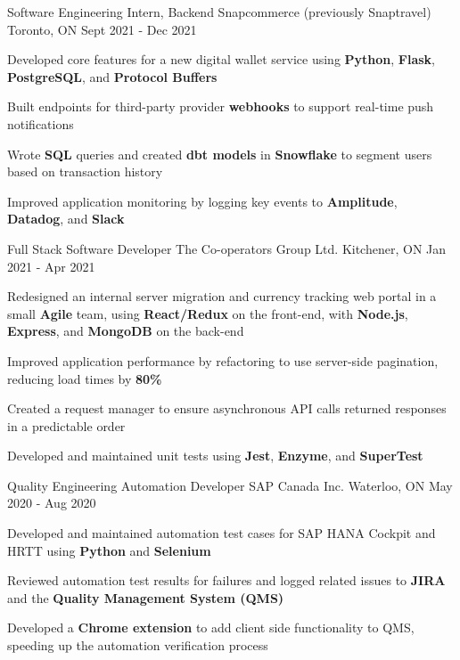 
\begin{cventries}
  \cventry
    {Software Engineering Intern, Backend} %
    {Snapcommerce (previously Snaptravel)} %
    {Toronto, ON} %
    {Sept 2021 - Dec 2021} %
    {
      \begin{cvitems} %
      \item {Developed core features for a new digital wallet service using \textbf{Python}, \textbf{Flask}, \textbf{PostgreSQL}, and \textbf{Protocol Buffers}}
      \item {Built endpoints for third-party provider \textbf{webhooks} to support real-time push notifications}
      \item {Wrote \textbf{SQL} queries and created \textbf{dbt models} in \textbf{Snowflake} to segment users based on transaction history}
      \item {Improved application monitoring by logging key events to \textbf{Amplitude}, \textbf{Datadog}, and \textbf{Slack}}
      \end{cvitems}
    }

  \cventry
    {Full Stack Software Developer} %
    {The Co-operators Group Ltd.} %
    {Kitchener, ON} %
    {Jan 2021 - Apr 2021} %
    {
      \begin{cvitems} %
      \item {Redesigned an internal server migration and currency tracking web portal in a small \textbf{Agile} team, using \textbf{React/Redux} on the front-end, with \textbf{Node.js}, \textbf{Express}, and \textbf{MongoDB} on the back-end}
      \item {Improved application performance by refactoring to use server-side pagination, reducing load times by \textbf{80\%}}
      \item {Created a request manager to ensure asynchronous API calls returned responses in a predictable order}
      \item {Developed and maintained unit tests using \textbf{Jest}, \textbf{Enzyme}, and \textbf{SuperTest}}
      \end{cvitems}
    }
    
  \cventry
    {Quality Engineering Automation Developer} %
    {SAP Canada Inc.} %
    {Waterloo, ON} %
    {May 2020 - Aug 2020} %
    {
      \begin{cvitems} %
      \item {Developed and maintained automation test cases for SAP HANA Cockpit and HRTT using \textbf{Python} and \textbf{Selenium}}
		  \item {Reviewed automation test results for failures and logged related issues to \textbf{JIRA} and the \textbf{Quality Management System (QMS)}}
		  \item {Developed a \textbf{Chrome extension} to add client side functionality to QMS, speeding up the automation verification process}
      \end{cvitems}
    }
       
\end{cventries}
